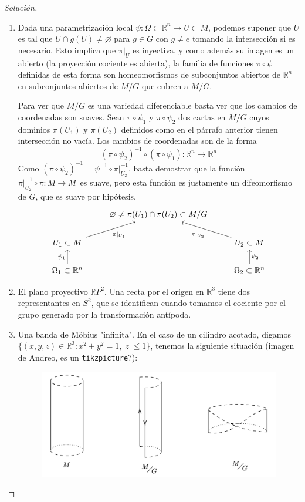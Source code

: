 \documentclass[spanish]{book}
\theoremstyle{definition}
\newcommand{\R}{\mathbb{R}}
\begin{document}
	\begin{proof}[Solución]\leavevmode
		\begin{enumerate}
			\item Dada una parametrización local $\psi:\Omega\subset\R^n\to U\subset M$, podemos suponer que $U$ es tal que $U\cap g(U)\neq\varnothing$ para $g\in G$ con $g\neq e$ tomando la intersección si es necesario. Esto implica que $\pi|_U$ es inyectiva, y como además su imagen es un abierto (la proyección cociente es abierta), la familia de funciones $\pi\circ\psi$ definidas de esta forma son homeomorfismos de subconjuntos abiertos de $\R^n$ en subconjuntos abiertos de $M/G$ que cubren a $M/G$.
			
			Para ver que $M/G$ es una variedad diferenciable basta ver que los cambios de coordenadas son suaves. Sean $\pi\circ\psi_1$ y $\pi\circ\psi_2$ dos cartas en $M/G$ cuyos dominios $\pi(U_1)$ y $\pi(U_2)$ definidos como en el párrafo anterior tienen intersección no vacía. Los cambios de coordenadas son de la forma
			\begin{equation}\label{ec:cambio-coord-traslacion}
				(\pi\circ\psi_2)^{-1}\circ(\pi\circ\psi_1):\R^n\to\R^n
			\end{equation}
			Como $(\pi\circ\psi_2)^{-1}=\psi^{-1}\circ\pi|_{U_2}^{-1}$, basta demostrar que la función $\pi|_{U_2}^{-1}\circ\pi:M\to M$ es suave, pero esta función es justamente un difeomorfismo de $G$, que es suave por hipótesis.
			\[\begin{tikzcd}
				&\varnothing\neq\pi(U_1)\cap\pi(U_2)\subset M/G\\
				U_1\subset M\arrow[swap]{ur}{\pi|_{U_1}}&&U_2\subset M\arrow{ul}{\pi|_{U_2}}\\
				\Omega_1\subset\R^n\arrow{u}{\psi_1}&&\Omega_2\subset\R^n\arrow[swap]{u}{\psi_2}
			\end{tikzcd}\]
			
			\item El plano proyectivo $\R P^2$. Una recta por el origen en $\R^3$ tiene dos representantes en $S^2$, que se identifican cuando tomamos el cociente por el grupo generado por la transformación antípoda.
			
			\item Una banda de Möbius "infinita". En el caso de un cilindro acotado, digamos $\{(x,y,z)\in\R^3:x^2+y^2=1,|z|\leq1\}$, tenemos la siguiente situación (imagen de Andreo, es un \texttt{tikzpicture}?):
			\begin{figure}[H]
				\centering
				\includegraphics[width=0.7\linewidth]{fig13}
			\end{figure}
			

\end{enumerate}
\end{proof}
\end{document}
